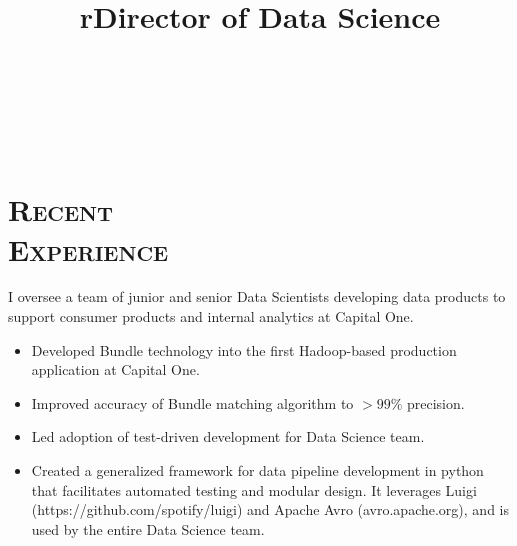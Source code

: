 \begin{resume}





\begin{formatb}
  \title{r}\\
  \\
  \body\\
\end{formatb}

\section{\textsc{Recent \\ Experience}}

\title{Director of Data Science}
\begin{position}
I oversee a team of junior and senior Data Scientists developing data products to support consumer products and internal analytics at Capital One.  
\begin{itemize}
\item Developed Bundle technology into the first Hadoop-based production application at Capital One.
\item Improved accuracy of Bundle matching algorithm to \begin{math} > 99 \% \end{math} precision.
\item Led adoption of test-driven development for Data Science team.
\item Created a generalized framework for data pipeline development in python that facilitates automated testing and modular design.  
It leverages Luigi (https://github.com/spotify/luigi) and Apache Avro (avro.apache.org), and is used by the entire Data Science team.
\end{itemize}
\end{position}


\end{resume}

